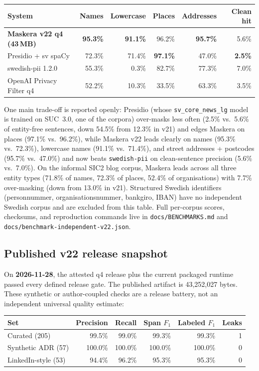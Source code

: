 \documentclass[10pt,a4paper]{article}
\newcommand{\pkg}[1]{\texttt{#1}}
\begin{document}
\begin{table}[H]
\centering
\footnotesize
\setlength{\tabcolsep}{4.5pt}
\begin{tabular}{lrrrrr}
\toprule
System & Names & Lowercase & Places & Addresses & Clean hit \\
\midrule
\textbf{Maskera v22 q4 (43\,MB)} & \textbf{95.3\%} & \textbf{91.1\%} & 96.2\% & \textbf{95.7\%} & 5.6\% \\
Presidio + sv spaCy & 72.3\% & 71.4\% & \textbf{97.1\%} & 47.0\% & \textbf{2.5\%} \\
swedish-pii 1.2.0 & 55.3\% & 0.3\% & 82.7\% & 77.3\% & 7.0\% \\
OpenAI Privacy Filter q4 & 52.2\% & 10.3\% & 33.5\% & 63.3\% & 3.5\% \\
\bottomrule
\end{tabular}
\end{table}

One main trade-off is reported openly: Presidio (whose
\pkg{sv\_core\_news\_lg} model is trained on SUC~3.0, one of the corpora)
over-masks less often (2.5\% vs.\ 5.6\% of entity-free sentences, down 54.5\%
from 12.3\% in v21) and edges Maskera on places (97.1\% vs.\ 96.2\%), while
Maskera v22 leads clearly on names (95.3\% vs.\ 72.3\%), lowercase names
(91.1\% vs.\ 71.4\%), and street addresses + postcodes (95.7\% vs.\ 47.0\%) and
now beats \pkg{swedish-pii} on clean-sentence precision (5.6\% vs.\ 7.0\%). On
the informal SIC2 blog corpus, Maskera leads across all three entity types
(71.8\% of names, 72.3\% of places, 52.4\% of organisations) with 7.7\%
over-masking (down from 13.0\% in v21). Structured Swedish identifiers
(personnummer, organisationsnummer, bankgiro, IBAN) have no independent Swedish
corpus and are excluded from this table. Full per-corpus scores, checksums, and
reproduction commands live in \pkg{docs/}\allowbreak\pkg{BENCHMARKS.md} and
\pkg{docs/}\allowbreak\pkg{benchmark-independent-v22.json}.

\subsection{Published v22 release snapshot}

On \textbf{2026-11-28}, the attested q4 release plus the current packaged
runtime passed every defined release gate. The published artifact is
43,252,027 bytes. These synthetic or author-coupled checks are a release
battery, not an independent universal quality estimate:

\begin{table}[H]
\centering
\begin{tabular}{lrrrrr}
\toprule
Set & Precision & Recall & Span $F_1$ & Labeled $F_1$ & Leaks \\
\midrule
Curated (205) & 99.5\% & 99.0\% & 99.3\% & 99.3\% & 1 \\
Synthetic ADR (57) & 100.0\% & 100.0\% & 100.0\% & 100.0\% & 0 \\
LinkedIn-style (53) & 94.4\% & 96.2\% & 95.3\% & 95.3\% & 0 \\
\bottomrule
\end{tabular}
\end{table}
\end{document}
